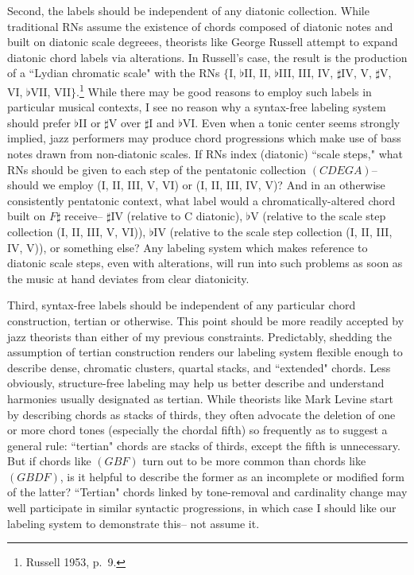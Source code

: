 Second, the labels should be independent of any diatonic collection.  While traditional RNs assume the existence of chords composed of diatonic notes and built on diatonic scale degreees, theorists like George Russell attempt to expand diatonic chord labels via alterations.  In Russell's case, the result is the production of a ``Lydian chromatic scale" with the RNs $\{$I, $\flat$II, II, $\flat$III, III, IV, $\sharp$IV, V, $\sharp$V, VI, $\flat$VII, VII$\}$.\footnote{Russell 1953, p.\ 9.}  While there may be good reasons to employ such labels in particular musical contexts, I see no reason why a syntax-free labeling system should prefer $\flat$II or $\sharp$V over $\sharp$I and $\flat$VI.  Even when a tonic center seems strongly implied, jazz performers may produce chord progressions which make use of bass notes drawn from non-diatonic scales.  If RNs index (diatonic) ``scale steps," what RNs should be given to each step of the pentatonic collection $(CDEGA)$-- should we employ (I, II, III, V, VI) or (I, II, III, IV, V)?  And in an otherwise consistently pentatonic context, what label would a chromatically-altered chord built on $F\sharp$ receive-- $\sharp$IV (relative to C diatonic), $\flat$V (relative to the scale step collection (I, II, III, V, VI)), $\flat$IV (relative to the scale step collection (I, II, III, IV, V)), or something else?  Any labeling system which makes reference to diatonic scale steps, even with alterations, will run into such problems as soon as the music at hand deviates from clear diatonicity.

Third, syntax-free labels should be independent of any particular chord construction, tertian or otherwise.  This point should be more readily accepted by jazz theorists than either of my previous constraints.  Predictably, shedding the assumption of tertian construction renders our labeling system flexible enough to describe dense, chromatic clusters, quartal stacks, and ``extended" chords.  Less obviously, structure-free labeling may help us better describe and understand harmonies usually designated as tertian.  While theorists like Mark Levine start by describing chords as stacks of thirds, they often advocate the deletion of one or more chord tones (especially the chordal fifth) so frequently as to suggest a general rule: ``tertian" chords are stacks of thirds, except the fifth is unnecessary.  But if chords like $(GBF)$ turn out to be more common than chords like $(GBDF)$, is it helpful to describe the former as an incomplete or modified form of the latter?  ``Tertian" chords linked by tone-removal and cardinality change may well participate in similar syntactic progressions, in which case I should like our labeling system to demonstrate this-- not assume it.

